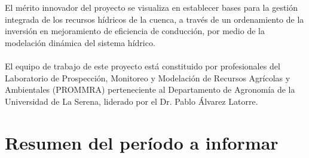 \documentclass[]{article}
\begin{document}
El mérito innovador del proyecto se visualiza en establecer bases para la gestión integrada de los recursos hídricos de la cuenca, a través de un ordenamiento de la inversión en mejoramiento de eficiencia de conducción, por medio de la modelación dinámica del sistema hídrico.\\
\\
El equipo de trabajo de este proyecto está constituido por profesionales del Laboratorio de Prospección, Monitoreo y Modelación de Recursos Agrícolas y Ambientales (PROMMRA) perteneciente al Departamento de Agronomía de la Universidad de La Serena, liderado por el Dr. Pablo Álvarez Latorre.\\
\clearpage

\section{Resumen del período a informar}
\end{document}
